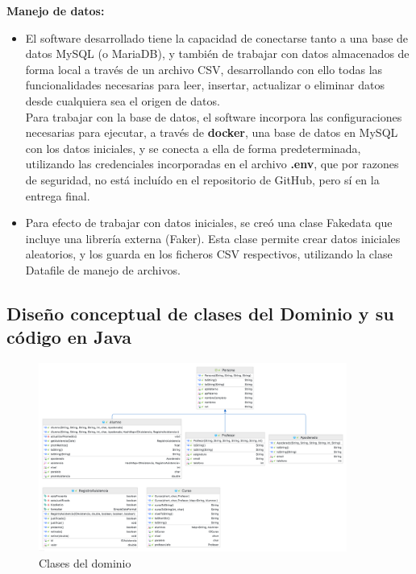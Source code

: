 \textbf{Manejo de datos:}
\begin{itemize}
    \item El software desarrollado tiene la capacidad de conectarse tanto a una base de datos MySQL (o MariaDB), y también de trabajar con datos almacenados de forma local a través de un archivo CSV, desarrollando con ello todas las funcionalidades necesarias para leer, insertar, actualizar o eliminar datos desde cualquiera sea el origen de datos.\\
    Para trabajar con la base de datos, el software incorpora las configuraciones necesarias para ejecutar, a través de \textbf{docker}, una base de datos en MySQL con los datos iniciales, y se conecta a ella de forma predeterminada, utilizando las credenciales incorporadas en el archivo \textbf{.env}, que por razones de seguridad, no está incluído en el repositorio de GitHub, pero sí en la entrega final.
    \item Para efecto de trabajar con datos iniciales, se creó una clase Fakedata que incluye una librería externa (Faker). Esta clase permite crear datos iniciales aleatorios, y los guarda en los ficheros CSV respectivos, utilizando la clase Datafile de manejo de archivos.
\end{itemize}

\clearpage

\subsection{Diseño conceptual de clases del Dominio y su código en Java}

\begin{figure}[h]
    \centering
    \includegraphics[width=0.9\textwidth]{contents/img/img1}
    \caption{Clases del dominio}
    \label{fig:img1}
\end{figure}

